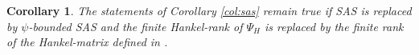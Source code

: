 \documentclass[journal,twoside,web]{ieeecolor}
\newtheorem{Corollary}[Theorem]{Corollary}
\begin{document}
  \begin{Corollary}
   The statements of Corollary \ref{col:sas} remain true if  SAS is replaced by $\psi$-bounded SAS and the finite Hankel-rank of $\Psi_H$ is replaced by the finite rank of the Hankel-matrix defined in \cite[Definition 2.7]{Son:Real}. 
  \end{Corollary}
\end{document}
